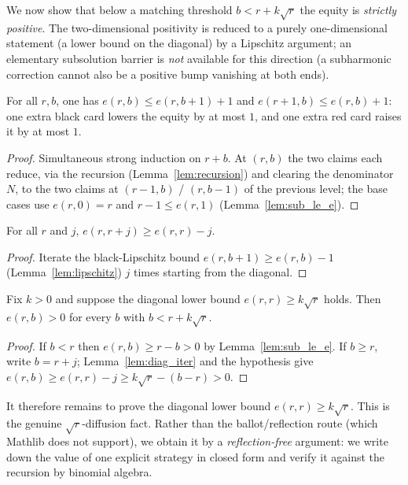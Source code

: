 We now show that below a matching threshold $b<r+k\sqrt r$ the equity is
\emph{strictly positive}. The two-dimensional positivity is reduced to a purely
one-dimensional statement (a lower bound on the diagonal) by a Lipschitz argument;
an elementary subsolution barrier is \emph{not} available for this direction
(a subharmonic correction cannot also be a positive bump vanishing at both ends).

\begin{lemma}\label{lem:lipschitz}
\leanok
{}
For all $r,b$, one has $e(r,b)\le e(r,b+1)+1$ and $e(r+1,b)\le e(r,b)+1$: one extra
black card lowers the equity by at most $1$, and one extra red card raises it by at
most $1$.
\end{lemma}
\begin{proof}\leanok
Simultaneous strong induction on $r+b$. At $(r,b)$ the two claims each reduce, via
the recursion (Lemma~\ref{lem:recursion}) and clearing the denominator $N$, to the
two claims at $(r-1,b)$ / $(r,b-1)$ of the previous level; the base cases use
$e(r,0)=r$ and $r-1\le e(r,1)$ (Lemma~\ref{lem:sub_le_e}).
\end{proof}

\begin{lemma}\label{lem:diag_iter}
\leanok
{}
For all $r$ and $j$, $e(r,r+j)\ge e(r,r)-j$.
\end{lemma}
\begin{proof}\leanok
Iterate the black-Lipschitz bound $e(r,b+1)\ge e(r,b)-1$ (Lemma~\ref{lem:lipschitz})
$j$ times starting from the diagonal.
\end{proof}

\begin{theorem}\label{thm:cond_positivity}
\leanok
{}
Fix $k>0$ and suppose the diagonal lower bound $e(r,r)\ge k\sqrt r$ holds. Then
$e(r,b)>0$ for every $b$ with $b<r+k\sqrt r$.
\end{theorem}
\begin{proof}\leanok
If $b<r$ then $e(r,b)\ge r-b>0$ by Lemma~\ref{lem:sub_le_e}. If $b\ge r$, write
$b=r+j$; Lemma~\ref{lem:diag_iter} and the hypothesis give
$e(r,b)\ge e(r,r)-j\ge k\sqrt r-(b-r)>0$.
\end{proof}

It therefore remains to prove the diagonal lower bound $e(r,r)\ge k\sqrt r$. This is
the genuine $\sqrt r$-diffusion fact. Rather than the ballot/reflection route (which
Mathlib does not support), we obtain it by a \emph{reflection-free} argument: we
write down the value of one explicit strategy in closed form and verify it against
the recursion by binomial algebra.

